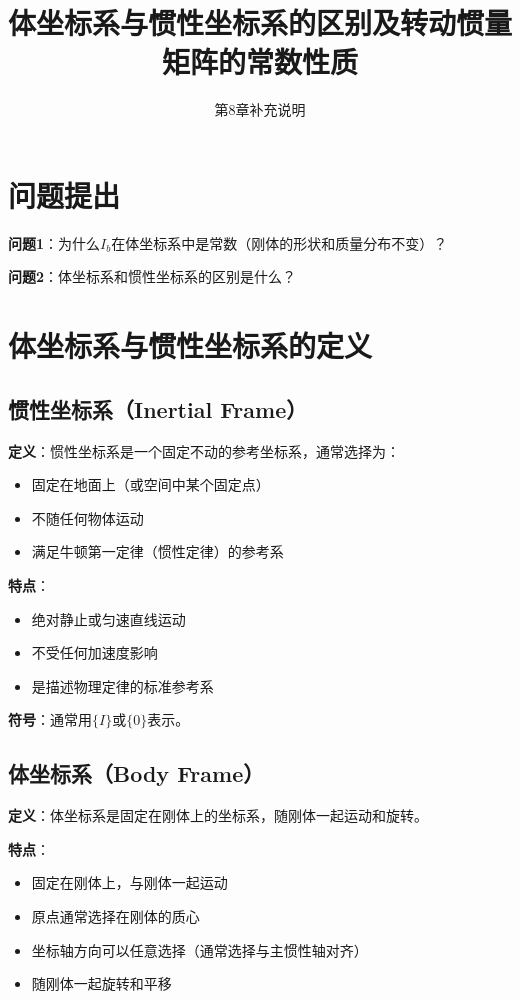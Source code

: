 \documentclass[12pt,a4paper]{article}
\title{体坐标系与惯性坐标系的区别及转动惯量矩阵的常数性质}
\author{第8章补充说明}
\date{}
\begin{document}
\maketitle

\section{问题提出}

\textbf{问题1}：为什么$I_b$在体坐标系中是常数（刚体的形状和质量分布不变）？

\textbf{问题2}：体坐标系和惯性坐标系的区别是什么？

\section{体坐标系与惯性坐标系的定义}

\subsection{惯性坐标系（Inertial Frame）}

\textbf{定义}：惯性坐标系是一个固定不动的参考坐标系，通常选择为：
\begin{itemize}
\item 固定在地面上（或空间中某个固定点）
\item 不随任何物体运动
\item 满足牛顿第一定律（惯性定律）的参考系
\end{itemize}

\textbf{特点}：
\begin{itemize}
\item 绝对静止或匀速直线运动
\item 不受任何加速度影响
\item 是描述物理定律的标准参考系
\end{itemize}

\textbf{符号}：通常用$\{I\}$或$\{0\}$表示。

\subsection{体坐标系（Body Frame）}

\textbf{定义}：体坐标系是固定在刚体上的坐标系，随刚体一起运动和旋转。

\textbf{特点}：
\begin{itemize}
\item 固定在刚体上，与刚体一起运动
\item 原点通常选择在刚体的质心
\item 坐标轴方向可以任意选择（通常选择与主惯性轴对齐）
\item 随刚体一起旋转和平移
\end{itemize}
\end{document}
